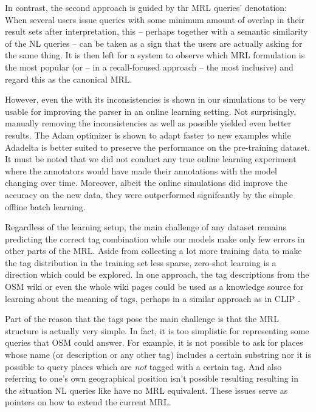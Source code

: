 In contrast, the second approach is guided by thr MRL queries’ denotation: When
several users issue queries with some minimum amount of overlap in their result
sets after interpretation, this – perhaps together with a semantic similarity of
the NL queries – can be taken as a sign that the users are actually asking for
the same thing. It is then left for a system to observe which MRL formulation is
the most popular (or – in a recall-focused approach – the most inclusive) and
regard this as the canonical MRL.

However, even the \nlmapsfourraw{} with its inconsistencies is shown in our
simulations to be very usable for improving the parser in an online learning
setting. Not surprisingly, manually removing the inconsistencies as well as
possible yielded even better results. The Adam optimizer is shown to adapt
faster to new examples while Adadelta is better suited to preserve the
performance on the pre-training dataset. It must be noted that we did not
conduct any true online learning experiment where the annotators would have made
their annotations with the model changing over time. Moreover, albeit the online
simulations did improve the accuracy on the new data, they were outperformed
signifcantly by the simple offline batch learning.

Regardless of the learning setup, the main challenge of any \nlmaps{} dataset
remains predicting the correct tag combination while our models make only few
errors in other parts of the MRL. Aside from collecting a lot more training data
to make the tag distribution in the training set less sparse, zero-shot learning
is a direction which could be explored. In one approach, the tag descriptions
from the OSM wiki or even the whole wiki pages could be used as a knowledge
source for learning about the meaning of tags, perhaps in a similar approach as
in CLIP \parencite{radford-2021}.

Part of the reason that the tags pose the main challenge is that the MRL
structure is actually very simple. In fact, it is too simplistic for
representing some queries that OSM could answer. For example, it is not possible
to ask for places whose name (or description or any other tag) includes a
certain substring nor it is possible to query places which are \emph{not} tagged
with a certain tag. And also referring to one’s own geographical position isn’t
possible resulting resulting in the situation NL queries like  have no MRL equivalent. These issues serve as pointers on how to
extend the current MRL.

